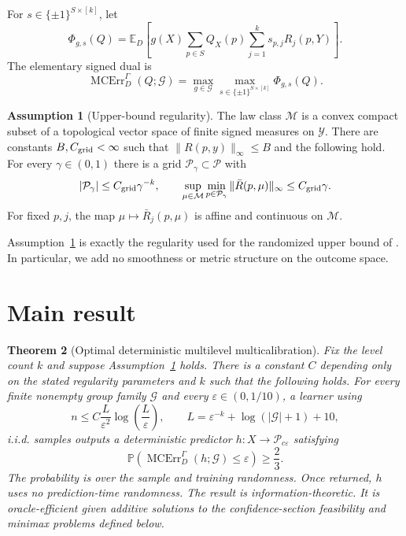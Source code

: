 \documentclass{article}
\newtheorem{theorem}{Theorem}
\theoremstyle{definition}
\newtheorem{assumption}[theorem]{Assumption}
\theoremstyle{remark}
\newcommand{\E}{\mathbb E}
\newcommand{\Prb}{\mathbb P}
\newcommand{\1}{\mathbf 1}
\newcommand{\cG}{\mathcal G}
\newcommand{\cM}{\mathcal M}
\newcommand{\cP}{\mathcal P}
\newcommand{\MCE}{\operatorname{MCErr}}
\begin{document}
For $s\in\{\pm1\}^{S\times[k]}$, let \[ \Phi_{g,s}(Q)=\E_D\!\left[g(X)\sum_{p\in S}Q_X(p)\sum_{j=1}^k s_{p,j}R_j(p,Y)\right]. \] The elementary signed dual is
\begin{equation}
\MCE_D^\Gamma(Q;\cG)=\max_{g\in\cG}\max_{s\in\{\pm1\}^{S\times[k]}}\Phi_{g,s}(Q).
\label{eq:signed}
\end{equation}

\begin{assumption}[Upper-bound regularity]\label{ass:regularity}
The law class $\cM$ is a convex compact subset of a topological vector space of finite signed measures on $\mathcal Y$. There are constants $B,C_{\rm grid}<\infty$ such that $\|R(p,y)\|_\infty\le B$ and the following hold. For every $\gamma\in(0,1)$ there is a grid $\cP_\gamma\subset\cP$ with \[ |\cP_\gamma|\le C_{\rm grid}\gamma^{-k},\qquad \sup_{\mu\in\cM}\min_{p\in\cP_\gamma}\|\bar R(p,\mu)\|_\infty\le C_{\rm grid}\gamma. \] For fixed $p,j$, the map $\mu\mapsto\bar R_j(p,\mu)$ is affine and continuous on $\cM$.
\end{assumption}

Assumption~\ref{ass:regularity} is exactly the regularity used for the randomized upper bound of \citet{lu2026multilevel}. In particular, we add no smoothness or metric structure on the outcome space.

\section{Main result}

\begin{theorem}[Optimal deterministic multilevel multicalibration]\label{thm:main}
Fix the level count $k$ and suppose Assumption~\ref{ass:regularity} holds. There is a constant $C$ depending only on the stated regularity parameters and $k$ such that the following holds. For every finite nonempty group family $\cG$ and every $\varepsilon\in(0,1/10)$, a learner using
\begin{equation}
n\le C\frac{L}{\varepsilon^2}\log\!\left(\frac{L}{\varepsilon}\right),
\qquad
L=\varepsilon^{-k}+\log(|\cG|+1)+10,
\label{eq:mainrate}
\end{equation}
i.i.d. samples outputs a deterministic predictor $h:X\to\cP_{c\varepsilon}$ satisfying \[ \Prb\!\left(\MCE_D^\Gamma(h;\cG)\le\varepsilon\right)\ge\frac23. \] The probability is over the sample and training randomness. Once returned, $h$ uses no prediction-time randomness. The result is information-theoretic. It is oracle-efficient given additive solutions to the confidence-section feasibility and minimax problems defined below.
\end{theorem}
\end{document}
